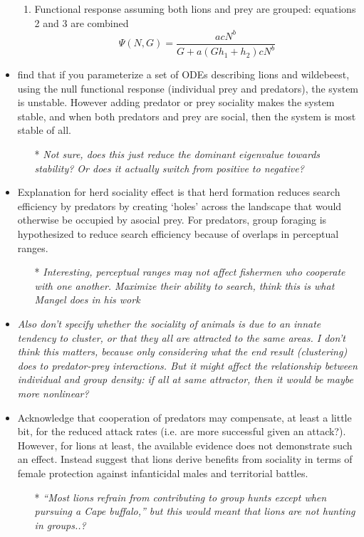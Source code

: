\documentclass[a4paper,10pt]{report}
\begin{document}
\begin{itemize}
\begin{enumerate}
\item Functional response assuming both lions and prey are grouped: equations 2 and 3 are combined
\[\Psi(N,G) = \frac{acN^b}{G+a(Gh_1+h_2)cN^b}\]
\end{enumerate}
\item find that if you parameterize a set of ODEs describing lions and wildebeest, using the null functional response (individual prey and predators), the system is unstable. However adding predator or prey sociality makes the system stable, and when both predators and prey are social, then the system is most stable of all. 
\begin{itemize}
\item[*] \textit{Not sure, does this just reduce the dominant eigenvalue towards stability? Or does it actually switch from positive to negative?}
\end{itemize}
\item Explanation for herd sociality effect is that herd formation reduces search efficiency by predators by creating `holes' across the landscape that would otherwise be occupied by asocial prey. For predators, group foraging is hypothesized to reduce search efficiency because of overlaps in perceptual ranges. 
\begin{itemize}
\item[*]\textit{Interesting, perceptual ranges may not affect fishermen who cooperate with one another. Maximize their ability to search, think this is what Mangel does in his work}
\end{itemize}
\item \textit{Also don't specify whether the sociality of animals is due to an innate tendency to cluster, or that they all are attracted to the same areas. I don't think this matters, because only considering what the end result (clustering) does to predator-prey interactions. But it might affect the relationship between individual and group density: if all at same attractor, then it would be maybe more nonlinear?}
\item Acknowledge that cooperation of predators may compensate, at least a little bit, for the reduced attack rates (i.e. are more successful given an attack?). However, for lions at least, the available evidence does not demonstrate such an effect. Instead suggest that lions derive benefits from sociality in terms of female protection against infanticidal males and territorial battles. 
\begin{itemize}
\item[*]\textit{``Most lions refrain from contributing to group hunts except when pursuing a Cape buffalo,'' but this would meant that lions are not hunting in groups..?}

\end{itemize}
\end{itemize}
\end{document}
